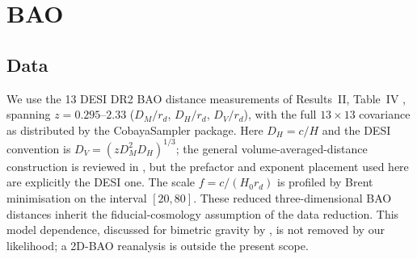 \section{BAO}\label{sec:bao}

\subsection{Data}
We use the 13 DESI DR2 BAO distance measurements of Results~II, Table~IV \citep{DESI2025a,DESI2025b}, spanning $z=0.295$--$2.33$ ($D_M/r_d$, $D_H/r_d$, $D_V/r_d$), with the full $13\times13$ covariance as distributed by the CobayaSampler  package. Here $D_H=c/H$ and the DESI convention is $D_V=(zD_M^2D_H)^{1/3}$; the general volume-averaged-distance construction is reviewed in \citet{Eisenstein2005}, but the prefactor and exponent placement used here are explicitly the DESI one. The scale $f=c/(H_0r_d)$ is profiled by Brent minimisation on the interval $[20,80]$. These reduced three-dimensional BAO distances inherit the fiducial-cosmology assumption of the data reduction. This model dependence, discussed for bimetric gravity by \citet{DwivediHogas2024}, is not removed by our likelihood; a 2D-BAO reanalysis is outside the present scope.

